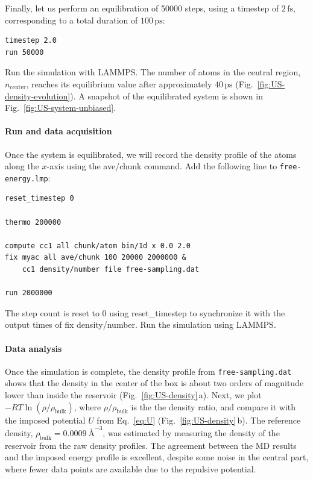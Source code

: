 \documentclass[9pt,tutorial]{livecoms}
\newcommand{\lmpcmd}[1]{\hspace{0pt}\colorbox{listing}{\textcolor{command}{\small{#1}}}\hspace{0pt}} %
\newcommand{\flecmd}[1]{\textcolor{command}{\texttt{#1}}} %
\begin{document}
Finally, let us perform an equilibration of 50000 steps,
using a timestep of $2\,\text{fs}$, corresponding to a total duration of $100\,\text{ps}$:
\begin{lstlisting}
timestep 2.0
run 50000
\end{lstlisting}
Run the simulation with LAMMPS.  The number of atoms in the
central region, $n_\mathrm{center}$, reaches its equilibrium value after approximately $40\,\text{ps}$
(Fig.~\ref{fig:US-density-evolution}).  A snapshot of the equilibrated system is shown in Fig.~\ref{fig:US-system-unbiased}.

\paragraph{Run and data acquisition}

Once the system is equilibrated, we will record the density profile of
the atoms along the $x$-axis using the \lmpcmd{ave/chunk} command.
Add the following line to \flecmd{free-energy.lmp}:
\begin{lstlisting}
reset_timestep 0

thermo 200000

compute cc1 all chunk/atom bin/1d x 0.0 2.0
fix myac all ave/chunk 100 20000 2000000 &
    cc1 density/number file free-sampling.dat

run 2000000
\end{lstlisting}
The step count is reset to 0 using \lmpcmd{reset\_timestep} to synchronize it
with the output times of \lmpcmd{fix density/number}.  Run the simulation using
LAMMPS.

\paragraph{Data analysis}

Once the simulation is complete, the density profile from \flecmd{free-sampling.dat}
shows that the density in the center of the box is
about two orders of magnitude lower than inside the reservoir (Fig.~\ref{fig:US-density}\,a).
Next, we plot $-R T \ln(\rho/\rho_\mathrm{bulk})$, %
{\color{blue} where $\rho/\rho_\mathrm{bulk}$ is the the density ratio,}
and compare it
with the imposed potential $U$ from Eq.~\eqref{eq:U} (Fig.~\ref{fig:US-density}\,b).
The reference density, $\rho_\text{bulk} = 0.0009~\text{\AA{}}^{-3}$,
was estimated by measuring the density of the reservoir from the raw density
profiles.  The agreement between the MD results and the imposed energy profile
is excellent, despite some noise in the central part, where fewer data points
are available due to the repulsive potential.
\end{document}
